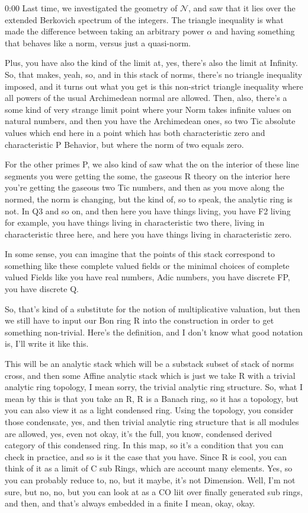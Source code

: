 \begin{unfinished}{0:00}
Last time, we investigated the geometry of $\mathcal{N}$, and saw that it lies over the extended Berkovich spectrum of the integers. The triangle inequality is what made the difference between taking an arbitrary power $\alpha$ and having something that behaves like a norm, versus just a quasi-norm.

Plus, you have also the kind of the limit at, yes, there's also the limit at Infinity. So, that makes, yeah, so, and in this stack of norms, there's no triangle inequality imposed, and it turns out what you get is this non-strict triangle inequality where all powers of the usual Archimedean normal are allowed. Then, also, there's a some kind of very strange limit point where your Norm takes infinite values on natural numbers, and then you have the Archimedean ones, so two Tic absolute values which end here in a point which has both characteristic zero and characteristic P Behavior, but where the norm of two equals zero.

For the other primes P, we also kind of saw what the on the interior of these line segments you were getting the some, the gaseous R theory on the interior here you're getting the gaseous two Tic numbers, and then as you move along the normed, the norm is changing, but the kind of, so to speak, the analytic ring is not. In Q3 and so on, and then here you have things living, you have F2 living for example, you have things living in characteristic two there, living in characteristic three here, and here you have things living in characteristic zero.

In some sense, you can imagine that the points of this stack correspond to something like these complete valued fields or the minimal choices of complete valued Fields like you have real numbers, Adic numbers, you have discrete FP, you have discrete Q.

So, that's kind of a substitute for the notion of multiplicative valuation, but then we still have to input our Bon ring R into the construction in order to get something non-trivial. Here's the definition, and I don't know what good notation is, I'll write it like this.

This will be an analytic stack which will be a substack subset of stack of norms cross, and then some Affine analytic stack which is just we take R with a trivial analytic ring topology, I mean sorry, the trivial analytic ring structure. So, what I mean by this is that you take an R, R is a Banach ring, so it has a topology, but you can also view it as a light condensed ring. Using the topology, you consider those condensate, yes, and then trivial analytic ring structure that is all modules are allowed, yes, even not okay, it's the full, you know, condensed derived category of this condensed ring.
In this map, so it's a condition that you can check in practice, and so is it the case that you have. Since R is cool, you can think of it as a limit of C sub Rings, which are account many elements. Yes, so you can probably reduce to, no, but it maybe, it's not Dimension. Well, I'm not sure, but no, no, but you can look at as a CO liit over finally generated sub rings, and then, and that's always embedded in a finite I mean, okay, okay.


\end{unfinished}
